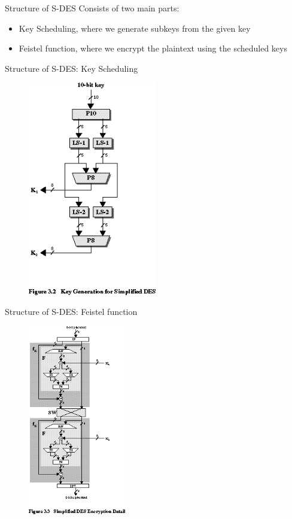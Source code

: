 \documentclass{beamer}
\begin{document}
    \begin{frame}{Structure of S-DES}
        Consists of two main parts:
        \begin{itemize}
            \item Key Scheduling, where we generate subkeys from the given key
            \item Feistel function, where we encrypt the plaintext using the scheduled keys
        \end{itemize}
    \end{frame}

    \begin{frame}{Structure of S-DES: Key Scheduling}
        \begin{figure}[h]
            \centering
            \includegraphics[width=0.5\textwidth]{./Images/keygen.png}
        \end{figure}
    \end{frame}

    \begin{frame}{Structure of S-DES: Feistel function}
        \begin{figure}[h]
            \centering
            \includegraphics[width=0.38\textwidth]{./Images/feistel.png}
        \end{figure}
    \end{frame}
\end{document}
